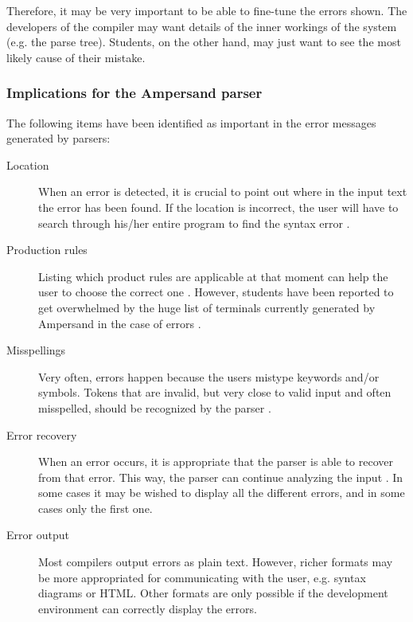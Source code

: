 Therefore, it may be very important to be able to fine-tune the errors shown.
The developers of the compiler may want details of the inner workings of the system (e.g. the parse tree).
Students, on the other hand, may just want to see the most likely cause of their mistake.

\subsubsection{Implications for the Ampersand parser}
\label{parsing:errors-ampersand}
The following items have been identified as important in the error messages generated by parsers:
\begin{description}
	\item[Location] When an error is detected, it is crucial to point out where in the input text the error has been found.
		If the location is incorrect, the user will have to search through his/her entire program to find the syntax error .
  \item[Production rules] Listing which product rules are applicable at that moment can help the user to choose the correct one .
		However, students have been reported to get overwhelmed by the huge list of terminals currently generated by Ampersand in the case of errors . 
	\item[Misspellings] Very often, errors happen because the users mistype keywords and/or symbols.
		Tokens that are invalid, but very close to valid input and often misspelled, should be recognized by the parser .
	\item[Error recovery] When an error occurs, it is appropriate that the parser is able to recover from that error.
		This way, the parser can continue analyzing the input .
		In some cases it may be wished to display all the different errors, and in some cases only the first one.
	\item[Error output] Most compilers output errors as plain text.
		However, richer formats may be more appropriated for communicating with the user, e.g. syntax diagrams or HTML.
		Other formats are only possible if the development environment can correctly display the errors.
\end{description}
